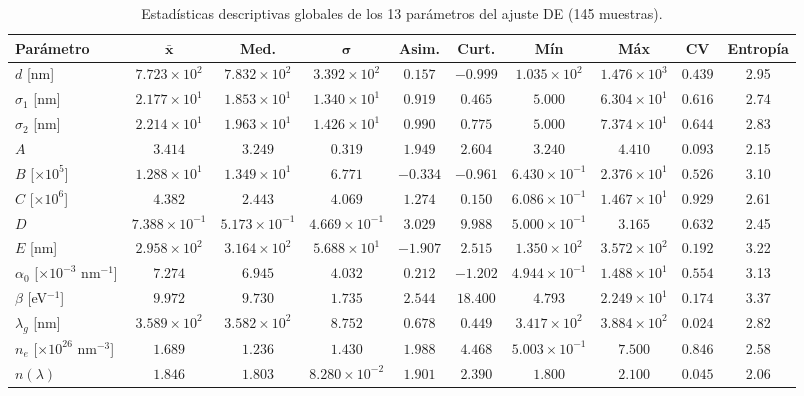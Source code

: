 \documentclass{article}
\begin{document}
\begin{table}[htbp]
\centering
\caption{Estad\'isticas descriptivas globales de los 13 par\'ametros del ajuste DE (145 muestras).}
\label{tab:global-stats}
\begin{tabular}{@{}lccccccccc@{}}
\toprule
\textbf{Par\'ametro} & $\boldsymbol{\bar{x}}$ & \textbf{Med.} & $\boldsymbol{\sigma}$ & \textbf{Asim.} & \textbf{Curt.} & \textbf{M\'in} & \textbf{M\'ax} & \textbf{CV} & \textbf{Entrop\'ia} \\
\midrule
$d$ [nm] & $7.723 \times 10^2$ & $7.832 \times 10^2$ & $3.392 \times 10^2$ & $0.157$ & $-0.999$ & $1.035 \times 10^2$ & $1.476 \times 10^3$ & $0.439$ & 2.95 \\
$\sigma_1$ [nm] & $2.177 \times 10^1$ & $1.853 \times 10^1$ & $1.340 \times 10^1$ & $0.919$ & $0.465$ & $5.000$ & $6.304 \times 10^1$ & $0.616$ & 2.74 \\
$\sigma_2$ [nm] & $2.214 \times 10^1$ & $1.963 \times 10^1$ & $1.426 \times 10^1$ & $0.990$ & $0.775$ & $5.000$ & $7.374 \times 10^1$ & $0.644$ & 2.83 \\
$A$ & $3.414$ & $3.249$ & $0.319$ & $1.949$ & $2.604$ & $3.240$ & $4.410$ & $0.093$ & 2.15 \\
$B$ [$\times 10^5$] & $1.288 \times 10^1$ & $1.349 \times 10^1$ & $6.771$ & $-0.334$ & $-0.961$ & $6.430 \times 10^{-1}$ & $2.376 \times 10^1$ & $0.526$ & 3.10 \\
$C$ [$\times 10^6$] & $4.382$ & $2.443$ & $4.069$ & $1.274$ & $0.150$ & $6.086 \times 10^{-1}$ & $1.467 \times 10^1$ & $0.929$ & 2.61 \\
$D$ & $7.388 \times 10^{-1}$ & $5.173 \times 10^{-1}$ & $4.669 \times 10^{-1}$ & $3.029$ & $9.988$ & $5.000 \times 10^{-1}$ & $3.165$ & $0.632$ & 2.45 \\
$E$ [nm] & $2.958 \times 10^2$ & $3.164 \times 10^2$ & $5.688 \times 10^1$ & $-1.907$ & $2.515$ & $1.350 \times 10^2$ & $3.572 \times 10^2$ & $0.192$ & 3.22 \\
$\alpha_0$ [$\times 10^{-3}$ nm$^{-1}$] & $7.274$ & $6.945$ & $4.032$ & $0.212$ & $-1.202$ & $4.944 \times 10^{-1}$ & $1.488 \times 10^1$ & $0.554$ & 3.13 \\
$\beta$ [eV$^{-1}$] & $9.972$ & $9.730$ & $1.735$ & $2.544$ & $18.400$ & $4.793$ & $2.249 \times 10^1$ & $0.174$ & 3.37 \\
$\lambda_g$ [nm] & $3.589 \times 10^2$ & $3.582 \times 10^2$ & $8.752$ & $0.678$ & $0.449$ & $3.417 \times 10^2$ & $3.884 \times 10^2$ & $0.024$ & 2.82 \\
$n_e$ [$\times 10^{26}$ nm$^{-3}$] & $1.689$ & $1.236$ & $1.430$ & $1.988$ & $4.468$ & $5.003 \times 10^{-1}$ & $7.500$ & $0.846$ & 2.58 \\
$n(\lambda)$ & $1.846$ & $1.803$ & $8.280 \times 10^{-2}$ & $1.901$ & $2.390$ & $1.800$ & $2.100$ & $0.045$ & 2.06 \\
\bottomrule
\end{tabular}
\end{table}
\end{document}
